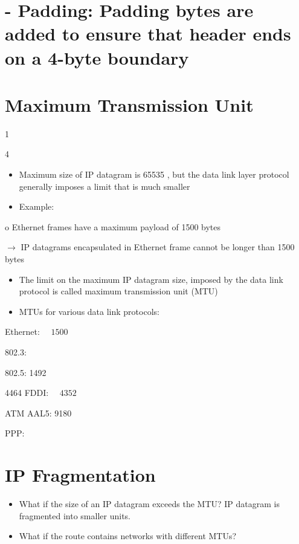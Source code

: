 \documentclass[10pt]{article}
\begin{document}
\section{- Padding: Padding bytes are added to ensure that header ends on a 4-byte boundary}
\section{Maximum Transmission Unit}
1

4

\begin{itemize}
  \item Maximum size of IP datagram is 65535 , but the data link layer protocol generally imposes a limit that is much smaller

  \item Example:

\end{itemize}

o Ethernet frames have a maximum payload of 1500 bytes

$\rightarrow$ IP datagrams encapsulated in Ethernet frame cannot be longer than 1500 bytes

\begin{itemize}
  \item The limit on the maximum IP datagram size, imposed by the data link protocol is called maximum transmission unit (MTU)

  \item MTUs for various data link protocols:

\end{itemize}

Ethernet: $\quad 1500$

802.3:

802.5: 1492

4464 FDDI: $\quad 4352$

ATM AAL5: 9180

PPP:

\section*{IP Fragmentation }


\begin{itemize}
  \item What if the size of an IP datagram exceeds the MTU? IP datagram is fragmented into smaller units.

  \item What if the route contains networks with different MTUs?

\end{itemize}
\end{document}
